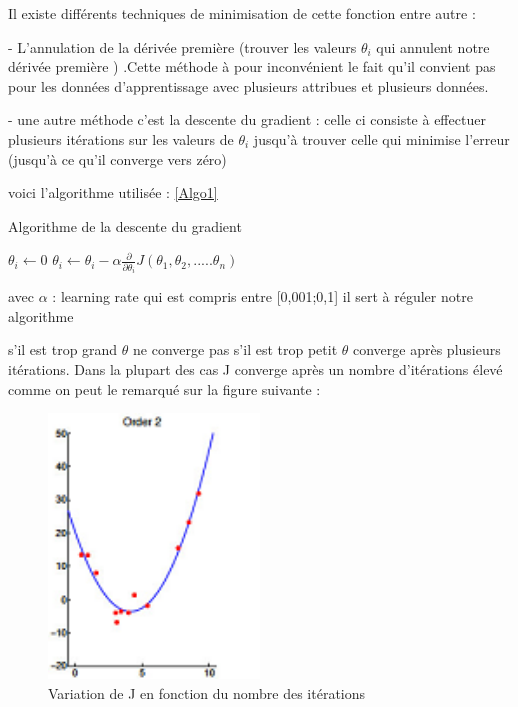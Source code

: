  Il existe différents techniques de minimisation de cette fonction entre autre :
 
  - L'annulation de la dérivée première (trouver les valeurs ${\theta }_{i}$ qui annulent notre dérivée première  ) .Cette méthode à pour inconvénient le fait qu'il convient pas pour les données d'apprentissage avec plusieurs attribues et plusieurs données. 
  
  - une autre méthode c'est la descente du gradient :
  celle ci consiste à effectuer plusieurs itérations sur les valeurs de  ${\theta }_{i}$ jusqu'à trouver celle qui minimise l'erreur (jusqu'à ce qu'il converge vers zéro)
  
  voici l'algorithme utilisée :
\ref{Algo1}
\begin{algorithm}[ht]
	\caption{Algorithme de la descente du gradient }
	\label{Algo1}
	\begin{algorithmic}
		\State ${\theta }_{i} \leftarrow 0$
		\State ${\theta }_{i} \leftarrow  {\theta }_{i} - \alpha \frac{\partial }{\partial {{\theta }_{i}}}J\left({\theta }_{1},{\theta }_{2},.....{\theta }_{n}\right)$
		\EndWhile
	\end{algorithmic}
   \end{algorithm}
  
  avec $\alpha$ : learning rate qui est compris entre [0,001;0,1] il sert à réguler notre algorithme
  
  s'il est trop grand $\theta$ ne converge pas
  s'il est trop petit $\theta$ converge après plusieurs itérations. 
  Dans la plupart des cas J converge après un nombre d'itérations élevé
  comme on peut le remarqué sur la figure suivante :
  \begin{figure}[ht]
  	\centering
  	\includegraphics[width=0.5\textwidth]{fig/regressionPlokynome.png}
  	\caption[Short caption]{Variation de J en fonction du nombre des itérations}
  	\label{fig:image3}
  \end{figure}
   

